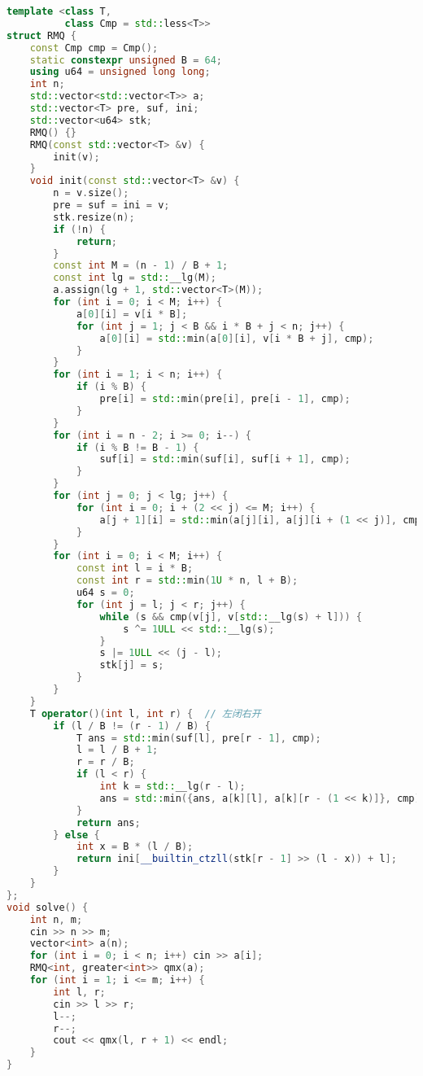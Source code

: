 \begin{lstlisting}[language=C++]
template <class T,
          class Cmp = std::less<T>>
struct RMQ {
    const Cmp cmp = Cmp();
    static constexpr unsigned B = 64;
    using u64 = unsigned long long;
    int n;
    std::vector<std::vector<T>> a;
    std::vector<T> pre, suf, ini;
    std::vector<u64> stk;
    RMQ() {}
    RMQ(const std::vector<T> &v) {
        init(v);
    }
    void init(const std::vector<T> &v) {
        n = v.size();
        pre = suf = ini = v;
        stk.resize(n);
        if (!n) {
            return;
        }
        const int M = (n - 1) / B + 1;
        const int lg = std::__lg(M);
        a.assign(lg + 1, std::vector<T>(M));
        for (int i = 0; i < M; i++) {
            a[0][i] = v[i * B];
            for (int j = 1; j < B && i * B + j < n; j++) {
                a[0][i] = std::min(a[0][i], v[i * B + j], cmp);
            }
        }
        for (int i = 1; i < n; i++) {
            if (i % B) {
                pre[i] = std::min(pre[i], pre[i - 1], cmp);
            }
        }
        for (int i = n - 2; i >= 0; i--) {
            if (i % B != B - 1) {
                suf[i] = std::min(suf[i], suf[i + 1], cmp);
            }
        }
        for (int j = 0; j < lg; j++) {
            for (int i = 0; i + (2 << j) <= M; i++) {
                a[j + 1][i] = std::min(a[j][i], a[j][i + (1 << j)], cmp);
            }
        }
        for (int i = 0; i < M; i++) {
            const int l = i * B;
            const int r = std::min(1U * n, l + B);
            u64 s = 0;
            for (int j = l; j < r; j++) {
                while (s && cmp(v[j], v[std::__lg(s) + l])) {
                    s ^= 1ULL << std::__lg(s);
                }
                s |= 1ULL << (j - l);
                stk[j] = s;
            }
        }
    }
    T operator()(int l, int r) {  // 左闭右开
        if (l / B != (r - 1) / B) {
            T ans = std::min(suf[l], pre[r - 1], cmp);
            l = l / B + 1;
            r = r / B;
            if (l < r) {
                int k = std::__lg(r - l);
                ans = std::min({ans, a[k][l], a[k][r - (1 << k)]}, cmp);
            }
            return ans;
        } else {
            int x = B * (l / B);
            return ini[__builtin_ctzll(stk[r - 1] >> (l - x)) + l];
        }
    }
};
void solve() {
    int n, m;
    cin >> n >> m;
    vector<int> a(n);
    for (int i = 0; i < n; i++) cin >> a[i];
    RMQ<int, greater<int>> qmx(a);
    for (int i = 1; i <= m; i++) {
        int l, r;
        cin >> l >> r;
        l--;
        r--;
        cout << qmx(l, r + 1) << endl;
    }
}
\end{lstlisting}
